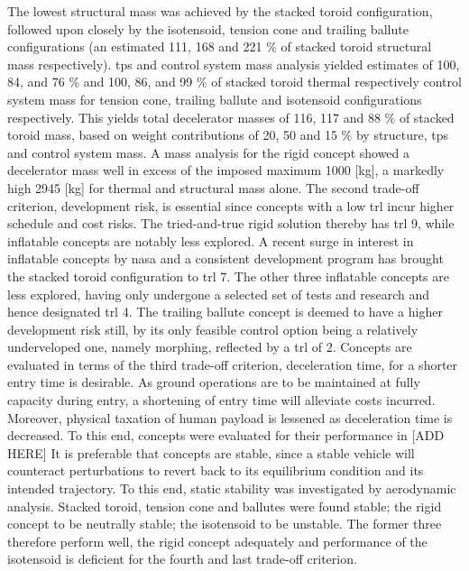 The lowest structural mass was achieved by the stacked toroid configuration, followed upon closely by the isotensoid, tension cone and trailing ballute configurations (an estimated 111, 168 and 221 \% of stacked toroid structural mass respectively). \acrfull{tps} and control system mass analysis yielded estimates of 100, 84, and 76 \% and 100, 86, and 99 \% of stacked toroid thermal respectively control system mass for tension cone, trailing ballute and isotensoid configurations respectively. This yields total decelerator masses of 116, 117 and 88 \% of stacked toroid mass, based on weight contributions of 20, 50 and 15 \% by structure, \gls{tps} and control system mass. A mass analysis for the rigid concept showed a decelerator mass well in excess of the imposed maximum 1000 [kg], a markedly high 2945 [kg] for thermal and structural mass alone.
\newline
\newline
The second trade-off criterion, development risk, is essential since concepts with a low \acrfull{trl} incur higher schedule and cost risks. The tried-and-true rigid solution thereby has \gls{trl} 9, while inflatable concepts are notably less explored. A recent surge in interest in inflatable concepts by \gls{nasa} and a consistent development program has brought the stacked toroid configuration to \gls{trl} 7. The other three inflatable concepts are less explored, having only undergone a selected set of tests and research and hence designated \gls{trl} 4. The trailing ballute concept is deemed to have a higher development risk still, by its only feasible control option being a relatively underveloped one, namely morphing, reflected by a \gls{trl} of 2.
\newline
\newline
Concepts are evaluated in terms of the third trade-off criterion, deceleration time, for a shorter entry time is desirable. As ground operations are to be maintained at fully capacity during entry, a shortening of entry time will alleviate costs incurred. Moreover, physical taxation of human payload is lessened as deceleration time is decreased. To this end, concepts were evaluated for their performance in [ADD HERE]
\newline
\newline
It is preferable that concepts are stable, since a stable vehicle will counteract perturbations to revert back to its equilibrium condition and its intended trajectory. To this end, static stability was investigated by aerodynamic analysis. Stacked toroid, tension cone and ballutes were found stable; the rigid concept to be neutrally stable; the isotensoid to be unstable. The former three therefore perform well, the rigid concept adequately and performance of the isotensoid is deficient for the fourth and last trade-off criterion.
